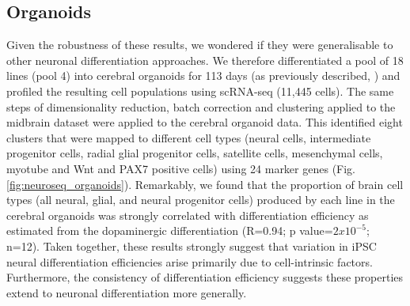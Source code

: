 \subsection{Organoids}
Given the robustness of these results, we wondered if they were generalisable to other neuronal differentiation approaches. 
We therefore differentiated a pool of 18 lines (pool 4) into cerebral organoids for 113 days (as previously described, \cite{lancaster2017guided}) and profiled the resulting cell populations using scRNA-seq (11,445 cells). 
The same steps of dimensionality reduction, batch correction and clustering applied to the midbrain dataset were applied to the cerebral organoid data. 
This identified eight clusters that were mapped to different cell types (neural cells, intermediate progenitor cells, radial glial progenitor cells, satellite cells, mesenchymal cells, myotube and Wnt and PAX7 positive cells) using 24
marker genes (Fig. \ref{fig:neuroseq_organoids}).
Remarkably, we found that the proportion of brain cell types (all neural, glial, and neural progenitor cells) produced by each line in the cerebral organoids was strongly correlated with differentiation efficiency as estimated from the dopaminergic differentiation (R=0.94; p value=$2x10^{-5}$; n=12). 
Taken together, these results strongly suggest that variation in iPSC neural differentiation efficiencies arise primarily due to cell-intrinsic factors. 
Furthermore, the consistency of differentiation efficiency suggests these properties extend to neuronal differentiation more generally.

